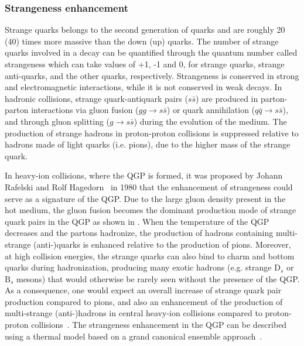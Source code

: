 \subsubsection{Strangeness enhancement}

Strange quarks belongs to the second generation of quarks and are roughly 20 (40) times more massive than the down (up) quarks. The number of strange quarks involved in a decay can be quantified through the quantum number called strangeness which can take values of +1, -1 and 0, for strange quarks, strange anti-quarks, and the other quarks, respectively. Strangeness is conserved in strong and electromagnetic interactions, while it is not conserved in weak decays. In hadronic collisions, strange quark-antiquark pairs ($s\bar{s}$) are produced in parton-parton interactions via gluon fusion ($gg \rightarrow s\bar{s}$) or quark annihilation ($q\bar{q} \rightarrow s\bar{s}$), and through gluon splitting ($g \rightarrow s\bar{s}$) during the evolution of the medium. The production of strange hadrons in proton-proton collisions is suppressed relative to hadrons made of light quarks (i.e. pions), due to the higher mass of the strange quark.

In heavy-ion collisions, where the QGP is formed, it was proposed by Johann Rafelski and Rolf Hagedorn~\cite{StrangenessEnhancement_1} in 1980 that the enhancement of strangeness could serve as a signature of the QGP. Due to the large gluon density present in the hot medium, the gluon fusion becomes the dominant production mode of strange quark pairs in the QGP as shown in . When the temperature of the QGP decreases and the partons hadronize, the production of hadrons containing multi-strange (anti-)quarks is enhanced relative to the production of pions. Moreover, at high collision energies, the strange quarks can also bind to charm and bottom quarks during hadronization, producing many exotic hadrons (e.g. strange $\mathrm{D}_{s}$ or $\mathrm{B}_{s}$ mesons) that would otherwise be rarely seen without the presence of the QGP. As a consequence, one would expect an overall increase of strange quark pair production compared to pions, and also an enhancement of the production of multi-strange (anti-)hadrons in central heavy-ion collisions compared to proton-proton collisions~\cite{StrangenessEnhancement_3}. The strangeness enhancement in the QGP can be described using a thermal model based on a grand canonical ensemble approach~\cite{StrangenessEnhancement_2}.

